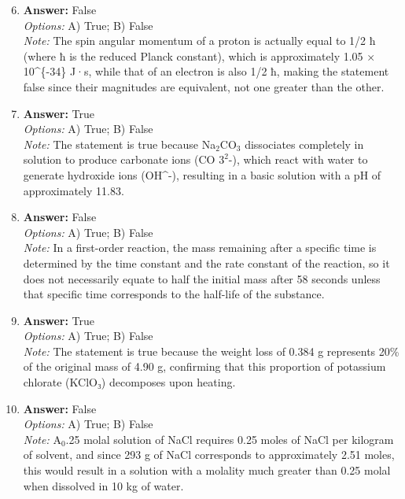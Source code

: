 \documentclass[12pt]{article}
\begin{document}
\begin{enumerate}[label=\arabic*.]
\setcounter{enumi}{5}
\item \textbf{Answer:} False
\\ \textit{Options:} A) True; B) False
\\ \textit{Note:} The spin angular momentum of a proton is actually equal to 1/2 ħ (where ħ is the reduced Planck constant), which is approximately 1.05 × 10^\{-34\} J·s, while that of an electron is also 1/2 ħ, making the statement false since their magnitudes are equivalent, not one greater than the other.
\item \textbf{Answer:} True
\\ \textit{Options:} A) True; B) False
\\ \textit{Note:} The statement is true because Na$_{2}$CO$_{3}$ dissociates completely in solution to produce carbonate ions (CO $3^2$-), which react with water to generate hydroxide ions (OH^-), resulting in a basic solution with a pH of approximately 11.83.
\item \textbf{Answer:} False
\\ \textit{Options:} A) True; B) False
\\ \textit{Note:} In a first-order reaction, the mass remaining after a specific time is determined by the time constant and the rate constant of the reaction, so it does not necessarily equate to half the initial mass after 58 seconds unless that specific time corresponds to the half-life of the substance.
\item \textbf{Answer:} True
\\ \textit{Options:} A) True; B) False
\\ \textit{Note:} The statement is true because the weight loss of 0.384 g represents 20\% of the original mass of 4.90 g, confirming that this proportion of potassium chlorate (KClO₃) decomposes upon heating.
\item \textbf{Answer:} False
\\ \textit{Options:} A) True; B) False
\\ \textit{Note:} A$_{0}$.25 molal solution of NaCl requires 0.25 moles of NaCl per kilogram of solvent, and since 293 g of NaCl corresponds to approximately 2.51 moles, this would result in a solution with a molality much greater than 0.25 molal when dissolved in 10 kg of water.
\end{enumerate}
\end{document}
